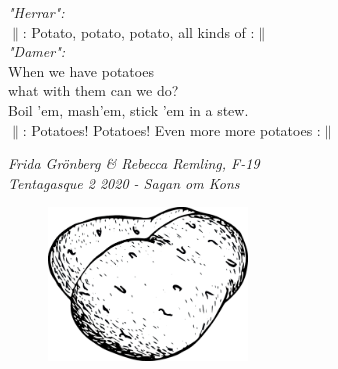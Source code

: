\documentclass[a6paper,10pt]{article}
\begin{document}
\begin{center}
\end{center}
\textit{"Herrar":}
\vspace{3pt}\\
$\|$: Potato, potato, potato, all kinds of :$\|$
\vspace{5pt}\\
\textit{"Damer":}
\vspace{3pt}\\
When we have potatoes\\
what with them can we do?\\
Boil ’em, mash’em, stick ’em in a stew.
\vspace{5pt}\\
$\|$: Potatoes! Potatoes! Even more more potatoes  :$\|$
\begin{flushright}
\textit{Frida Grönberg \& Rebecca Remling, F-19 \\Tentagasque 2 2020 - Sagan om Kons}
\end{flushright}

\vspace{20pt}
\begin{figure}[h!]
\begin{center}
\includegraphics[width=150pt]{potatiskanon}
\end{center}
\end{figure}

\setlength{\oddsidemargin}{-0.47in}
\end{document}
